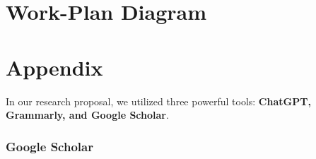 \documentclass{epsrc}
\begin{document}
\newpage

\part{Work-Plan Diagram}
\vspace{30pt}


\begin{figure}[hbtp]
    \centering
\end{figure}

\vspace{5pt}

\newpage

\part{Appendix}
\vspace{5pt}

In our research proposal, we utilized three powerful tools: \textbf{ChatGPT, Grammarly, and Google Scholar}. 
\vspace{5pt}

\section{Google Scholar}
\vspace{5pt}
\end{document}
